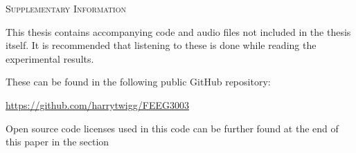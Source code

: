 \begin{center}
    \textsc{Supplementary Information}
\end{center}

This thesis contains accompanying code and audio files not included in the thesis itself. It is recommended that listening to these is done while reading the experimental results.

These can be found in the following public GitHub repository:

\href{https://github.com/harrytwigg/FEEG3003}{https://github.com/harrytwigg/FEEG3003}

Open source code licenses used in this code can be further found at the end of this paper in the section 